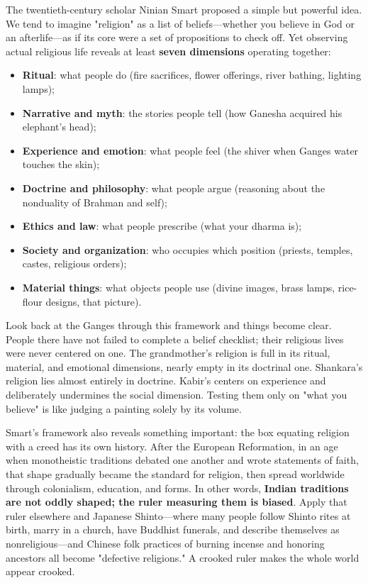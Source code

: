 The twentieth-century scholar Ninian Smart proposed a simple but powerful idea. We tend to imagine "religion" as a list of beliefs---whether you believe in God or an afterlife---as if its core were a set of propositions to check off. Yet observing actual religious life reveals at least \textbf{seven dimensions} operating together:

\begin{itemize}
\item \textbf{Ritual}: what people do (fire sacrifices, flower offerings, river bathing, lighting lamps);
\item \textbf{Narrative and myth}: the stories people tell (how Ganesha acquired his elephant's head);
\item \textbf{Experience and emotion}: what people feel (the shiver when Ganges water touches the skin);
\item \textbf{Doctrine and philosophy}: what people argue (reasoning about the nonduality of Brahman and self);
\item \textbf{Ethics and law}: what people prescribe (what your dharma is);
\item \textbf{Society and organization}: who occupies which position (priests, temples, castes, religious orders);
\item \textbf{Material things}: what objects people use (divine images, brass lamps, rice-flour designs, that picture).
\end{itemize}
Look back at the Ganges through this framework and things become clear. People there have not failed to complete a belief checklist; their religious lives were never centered on one. The grandmother's religion is full in its ritual, material, and emotional dimensions, nearly empty in its doctrinal one. Shankara's religion lies almost entirely in doctrine. Kabir's centers on experience and deliberately undermines the social dimension. Testing them only on "what you believe" is like judging a painting solely by its volume.

Smart's framework also reveals something important: the box equating religion with a creed has its own history. After the European Reformation, in an age when monotheistic traditions debated one another and wrote statements of faith, that shape gradually became the standard for religion, then spread worldwide through colonialism, education, and forms. In other words, \textbf{Indian traditions are not oddly shaped; the ruler measuring them is biased}. Apply that ruler elsewhere and Japanese Shinto---where many people follow Shinto rites at birth, marry in a church, have Buddhist funerals, and describe themselves as nonreligious---and Chinese folk practices of burning incense and honoring ancestors all become "defective religions." A crooked ruler makes the whole world appear crooked.

